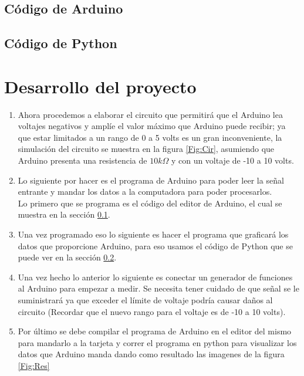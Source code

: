 \documentclass{article}
\begin{document}
\subsection{Código de Arduino}\label{Cod:Ard}

\subsection{Código de Python}\label{Cod:Py}


\section{Desarrollo del proyecto}
\begin{enumerate}
\item Ahora procedemos a elaborar el circuito que permitirá que el Arduino lea voltajes
negativos y amplíe el valor máximo que Arduino puede recibir; ya que estar limitados a un
rango de 0 a 5 volts es un gran inconveniente, la simulación del circuito se muestra en la
figura \ref{Fig:Cir}, asumiendo que Arduino presenta una resistencia de $10k\Omega$ y con
un voltaje de -10 a 10 volts.
\item Lo siguiente por hacer es el programa de Arduino para poder leer la señal entrante y
mandar los datos a la computadora para poder procesarlos.\\
Lo primero que se programa es el código del editor de Arduino, el cual se muestra en la
sección \ref{Cod:Ard}.
\item Una vez programado eso lo siguiente es hacer el programa que graficará los datos que
proporcione Arduino, para eso usamos el código de Python que se puede ver en la sección
\ref{Cod:Py}.
\item Una vez hecho lo anterior lo siguiente es conectar un generador de funciones al
Arduino para empezar a medir. Se necesita tener cuidado de que señal se le suministrará ya
que exceder el límite de voltaje podría causar daños al circuito (Recordar que el nuevo
rango para el voltaje es de -10 a 10 volts).
\item Por último se debe compilar el programa de Arduino en el editor del mismo para
mandarlo a la tarjeta y correr el programa en python para visualizar los datos que Arduino
manda dando como resultado las imagenes de la figura \ref{Fig:Res}
\end{enumerate}
\end{document}

